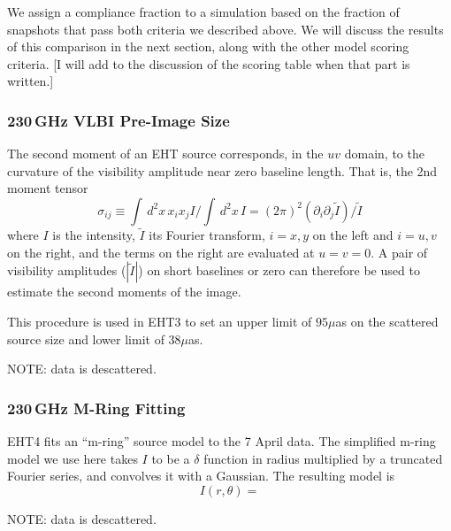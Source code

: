 We assign a compliance fraction to a simulation based on the fraction
of snapshots that pass both criteria we described above.
We will discuss the results of this comparison in the next section,
along with the other model scoring criteria.
[I will add to the discussion of the scoring table when that part is
  written.]

\subsubsection{230\,GHz VLBI Pre-Image Size}


The second moment of an EHT source corresponds, in the $uv$ domain, to
the curvature of the visibility amplitude near zero baseline length.
That is, the 2nd moment tensor
\begin{equation}
    \sigma_{ij} \equiv \int \, d^2x\, x_i x_j I/\int \, d^2x \, I = (2\pi)^2 \left(\partial_i \partial_j \tilde{I}\right)/\tilde{I}
\end{equation}
where $I$ is the intensity, $\tilde{I}$ its Fourier transform, $i =
x,y$ on the left and $i = u,v$ on the right, and the terms on the
right are evaluated at $u = v = 0$.
A pair of visibility amplitudes ($|\tilde{I}|$) on short baselines or
zero can therefore be used to estimate the second moments of the
image.

This procedure is used in EHT3 to set an upper limit of $95\mu$as on
the scattered source size and lower limit of $38\mu$as.

NOTE: data is descattered.

\subsubsection{230\,GHz M-Ring Fitting}

EHT4 fits an ``m-ring'' source model to the 7 April data.
The simplified m-ring model we use here takes $I$ to be a $\delta$
function in radius multiplied by a truncated Fourier series, and
convolves it with a Gaussian.
The resulting model is
\begin{equation}
    I(r,\theta) =
\end{equation}

NOTE: data is descattered.

